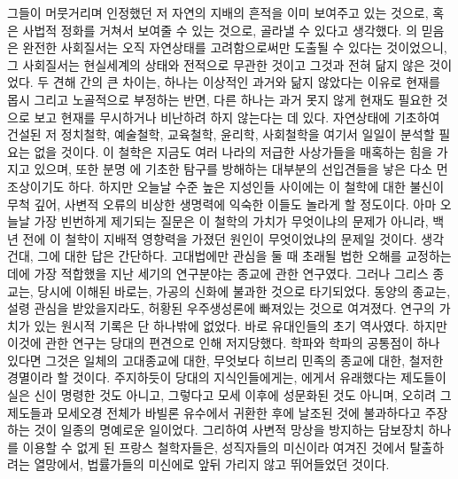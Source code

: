 그들이 머뭇거리며 인정했던 저 자연의 지배의 흔적을 이미 보여주고 있는 것으로,
혹은 사법적 정화를 거쳐서 보여줄 수 있는 것으로,
골라낼 수 있다고 생각했다.
의 믿음은 완전한 사회질서는 오직 자연상태를 고려함으로써만
도출될 수 있다는 것이었으니, 그 사회질서는
현실세계의 상태와 전적으로 무관한 것이고 그것과 전혀 닮지 않은 것이었다.
두 견해 간의 큰 차이는, 하나는
이상적인 과거와 닮지 않았다는 이유로 현재를 몹시 그리고 노골적으로 부정하는 반면,
다른 하나는 과거 못지 않게 현재도 필요한 것으로 보고 현재를 무시하거나
비난하려 하지 않는다는 데 있다.
자연상태에 기초하여 건설된 저 정치철학, 예술철학, 교육철학,
윤리학, 사회철학을 여기서 일일이 분석할 필요는 없을 것이다.
이 철학은 지금도 여러 나라의 저급한 사상가들을 매혹하는 힘을 가지고 있으며,
또한 분명 에 기초한 탐구를 방해하는
대부분의 선입견들을 낳은 다소 먼 조상이기도 하다.
하지만 오늘날 수준 높은 지성인들 사이에는 이 철학에 대한 불신이 무척 깊어,
사변적 오류의 비상한 생명력에 익숙한 이들도 놀라게 할 정도이다.
아마 오늘날 가장 빈번하게 제기되는 질문은 이 철학의 가치가 무엇이냐의 문제가
아니라, 백 년 전에 이 철학이 지배적 영향력을 가졌던 원인이
무엇이었냐의 문제일 것이다.
생각건대, 그에 대한 답은 간단하다.
고대법에만 관심을 둘 때 초래될 법한 오해를 교정하는 데에
가장 적합했을 지난 세기의 연구분야는 종교에 관한 연구였다.
그러나 그리스 종교는, 당시에 이해된 바로는, 가공의 신화에 불과한 것으로
타기되었다.
동양의 종교는, 설령 관심을 받았을지라도, 허황된 우주생성론에
빠져있는 것으로 여겨졌다.
연구의 가치가 있는 원시적 기록은 단 하나밖에 없었다.
바로 유대인들의 초기 역사였다.
하지만 이것에 관한 연구는 당대의 편견으로 인해 저지당했다.
 학파와  학파의 공통점이 하나 있다면 그것은
일체의 고대종교에 대한, 무엇보다 히브리 민족의 종교에 대한,
철저한 경멸이라 할 것이다.
주지하듯이 당대의 지식인들에게는, 에게서 유래했다는 제도들이
실은 신이 명령한 것도 아니고, 그렇다고 모세 이후에 성문화된 것도 아니며,
오히려 그 제도들과 모세오경 전체가
바빌론 유수에서 귀환한 후에 날조된 것에 불과하다고
주장하는 것이 일종의 명예로운 일이었다.
그리하여 사변적 망상을 방지하는 담보장치 하나를 이용할 수 없게 된
프랑스 철학자들은, 성직자들의 미신이라 여겨진 것에서 탈출하려는 열망에서,
법률가들의 미신에로 앞뒤 가리지 않고 뛰어들었던 것이다.


